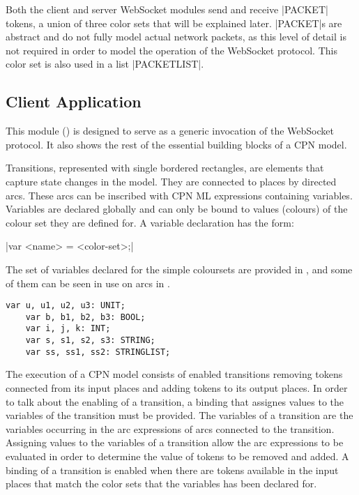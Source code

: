 	Both the client and server WebSocket modules send and receive
	|PACKET| tokens, a union of three color sets that will be explained later.
	|PACKET|s are abstract and do not fully model actual network packets, as this
	level of detail is not required in order to model the operation of the
	WebSocket protocol.
	This color set is also used in a list |PACKETLIST|.
	

\subsection{Client Application}

	
	This module () is designed to serve as a generic invocation
	of the WebSocket protocol. It also shows the rest of the essential building blocks
	of a CPN model.
	
	Transitions, represented with single bordered rectangles, are elements that
	capture state changes in the model. They are connected to places by
	directed arcs. These arcs can be inscribed with CPN ML expressions containing
	variables. Variables are declared globally and can only be bound to values
	(colours) of the colour set they are defined for. A variable declaration has
	the form:
	
	|var <name> = <color-set>;|
	
	The set of variables declared for the simple coloursets are provided in
	, and some of them can be seen in use on arcs in
	. 
	
	\begin{lstlisting}[label=lst:standard_vars,caption=Simple Colourset
	Variables,gobble=1,float=h] 
	var u, u1, u2, u3: UNIT;
	var b, b1, b2, b3: BOOL;
	var i, j, k: INT;
	var s, s1, s2, s3: STRING;
	var ss, ss1, ss2: STRINGLIST;
	\end{lstlisting}
	
	The execution of a CPN model consists of enabled transitions removing tokens
	connected from its input places and adding tokens to its output places. In
	order to talk about the enabling of a transition, a binding that assignes
	values to the variables of the transition must be provided. The variables of a
	transition are the variables occurring in the arc expressions of arcs
	connected to the transition. Assigning values to the variables of a transition
	allow the arc expressions to be evaluated in order to determine the value of
	tokens to be removed and added. A binding of a transition is enabled when
	there are tokens available in the input places that match the color sets that
	the variables has been declared for. 

